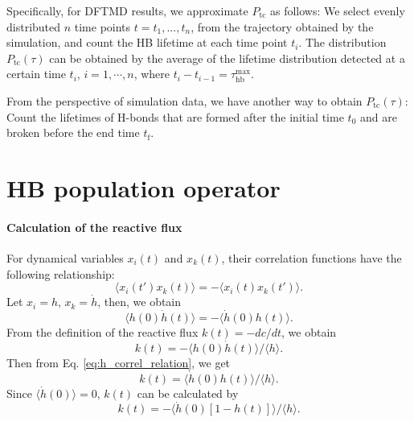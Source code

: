 {Specifically, for DFTMD results, we approximate $P_\text{tc}$ as follows: 
We select evenly distributed $n$ time points $t=t_1,...,t_n$, from the trajectory obtained by the simulation, 
and count the HB lifetime at each time point $t_i$.
The distribution $P_\text{tc}(\tau)$ 
can be obtained by the average of the lifetime distribution detected at a certain time $t_i$, $i=1,\cdots, n$, 
where $t_i-t_{i-1} = \tau_\text{hb}^{\max}$. 

From the perspective of simulation data, we have another way to obtain $P_\text{tc}(\tau)$: 
Count the lifetimes of H-bonds that are formed after the initial time $t_0$ and are broken before the end time $t_\text{f}$.

\section{HB population operator}\label{hbpo}
\paragraph{Calculation of the reactive flux}\label{calc_rf}
For dynamical variables $x_i(t)$ and $x_k(t)$, their correlation functions have the following relationship\cite{Landau1980}:
\begin{equation}
\langle x_i(t') x_k(t)\rangle = -\langle x_i(t) x_k(t')\rangle.
\label{eq:correlation_relation}
\end{equation}
Let $x_i = h$, $x_k = \dot h$,
then, we obtain
\begin{equation}
\langle h(0) \dot{h}(t)\rangle=-\langle\dot{h}(0) h(t)\rangle. 
\label{eq:h_correl_relation}
\end{equation}
From the definition of the reactive flux $k(t) = -dc/dt$, we obtain 
\begin{equation}
k(t)=-\langle h(0) \dot{h}(t)\rangle /\langle h\rangle. 
\label{eq:rf1}
\end{equation}
Then from Eq. \ref{eq:h_correl_relation},
we get 
\begin{equation}
k(t) =  \langle \dot{h}(0)h(t)\rangle /\langle h\rangle. \nonumber
\label{eq:rf2}
\end{equation}
Since $\langle\dot{h}(0)\rangle=0$, $k(t)$ can be calculated by
\begin{equation}
k(t) = - \langle \dot{h}(0)[1-h(t)]\rangle /\langle h\rangle.
\label{eq:rf3}
\end{equation}


}
